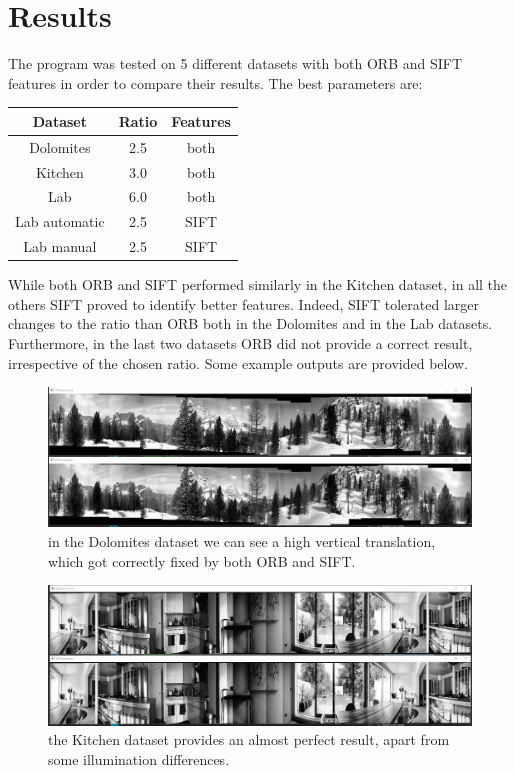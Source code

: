 \documentclass{article}
\begin{document}
\section{Results}
The program was tested on 5 different datasets with both ORB and SIFT features in order to compare their results.
The best parameters are:\\

\begin{center}
\begin{tabular}{ |c|c|c| }
\hline
Dataset & Ratio & Features \\
\hline
\hline
Dolomites & 2.5 & both \\
\hline
Kitchen & 3.0 & both \\
\hline
Lab & 6.0 & both \\
\hline
Lab automatic & 2.5 & SIFT \\
\hline
Lab manual & 2.5 & SIFT \\
\hline
\end{tabular}
\end{center}

While both ORB and SIFT performed similarly in the Kitchen dataset, in all the others SIFT proved to identify better features.
Indeed, SIFT tolerated larger changes to the ratio than ORB both in the Dolomites and in the Lab datasets. Furthermore, in the last two datasets ORB did not provide a correct result, irrespective of the chosen ratio.
Some example outputs are provided below.

\begin{figure}[h]
\begin{center}
\includegraphics[width=1\textwidth]{images/dolomites}
\caption{\footnotesize{in the Dolomites dataset we can see a high vertical translation, which got correctly fixed by both ORB and SIFT.}}
\label{img_dolomites}
\end{center}
\end{figure}

\begin{figure}[h]
\begin{center}
\includegraphics[width=1\textwidth]{images/kitchen}
\caption{\footnotesize{the Kitchen dataset provides an almost perfect result, apart from some illumination differences.}}
\label{img_kitchen}
\end{center}
\end{figure}
\end{document}
